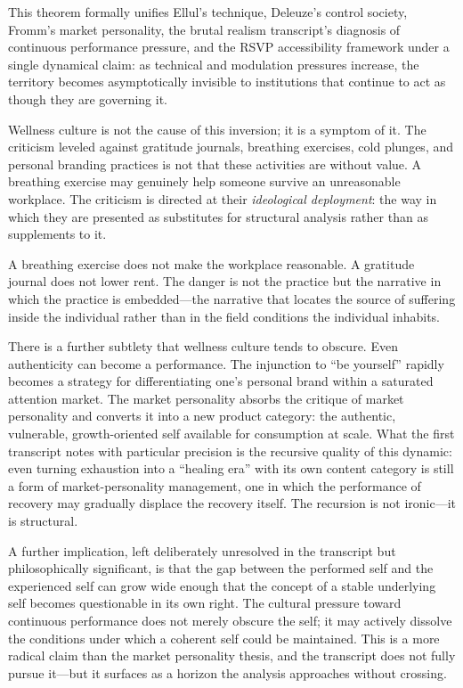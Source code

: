 \documentclass[12pt, a4paper]{article}
\theoremstyle{plain}
\theoremstyle{definition}
\theoremstyle{remark}
\begin{document}
This theorem formally unifies Ellul's technique, Deleuze's control society,
Fromm's market personality, the brutal realism transcript's diagnosis of continuous
performance pressure, and the RSVP accessibility framework under a single dynamical
claim: as technical and modulation pressures increase, the territory becomes
asymptotically invisible to institutions that continue to act as though they are
governing it.

Wellness culture is not the cause of this inversion; it is a symptom of it.
The criticism leveled against gratitude journals, breathing exercises, cold plunges,
and personal branding practices is not that these activities are without value.
A breathing exercise may genuinely help someone survive an unreasonable workplace.
The criticism is directed at their \emph{ideological deployment}: the way in which
they are presented as substitutes for structural analysis rather than as supplements to it.

A breathing exercise does not make the workplace reasonable.
A gratitude journal does not lower rent.
The danger is not the practice but the narrative in which the practice is embedded---the
narrative that locates the source of suffering inside the individual rather than in
the field conditions the individual inhabits.

There is a further subtlety that wellness culture tends to obscure.
Even authenticity can become a performance.
The injunction to ``be yourself'' rapidly becomes a strategy for differentiating one's
personal brand within a saturated attention market.
The market personality absorbs the critique of market personality and converts it
into a new product category: the authentic, vulnerable, growth-oriented self
available for consumption at scale.
What the first transcript notes with particular precision is the recursive quality of this
dynamic: even turning exhaustion into a ``healing era'' with its own content category
is still a form of market-personality management, one in which the performance of
recovery may gradually displace the recovery itself.
The recursion is not ironic---it is structural.

A further implication, left deliberately unresolved in the transcript but philosophically
significant, is that the gap between the performed self and the experienced self
can grow wide enough that the concept of a stable underlying self becomes
questionable in its own right.
The cultural pressure toward continuous performance does not merely obscure the self;
it may actively dissolve the conditions under which a coherent self could be maintained.
This is a more radical claim than the market personality thesis, and the transcript does
not fully pursue it---but it surfaces as a horizon the analysis approaches without crossing.
\end{document}
